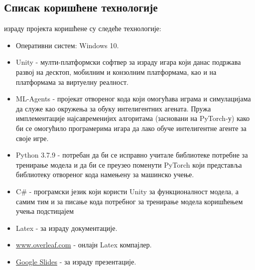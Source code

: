 \documentclass[12pt]{article}
\begin{document}
\subsection{Списак коришћене технологије}
 израду пројекта коришћене су следеће технологије:
\begin{itemize}
  \item Оперативни систем: Windows 10.
  \item Unity - мулти-платформски софтвер за израду игара који данас подржава развој на десктоп, мобилним и конзолним платформама, као и на платформама за виртуелну реалност.
  \item ML-Agents - пројекат отвореног кода који омогућава играма и симулацијама да служе као окружења за обуку интелигентних агената. Пружа имплементације најсавременијих алгоритама (засновани на PyTorch-у) како би се омогућило програмерима игара да лако обуче интелигентне агенте за своје игре.
  \item Python 3.7.9 - потребан да би се исправно учитале библиотеке потребне за тренирање модела и да би се преузео поменути PyTorch који представља библиотеку отвореног кода намењену за машинско учење. 
  \item C\# - програмски језик који користи Unity за функционалност модела, а самим тим и за писање кода потребног за тренирање модела коришћењем учења подстицајем
  \item Latex - за израду документације.
  \item \url{www.overleaf.com} - онлајн Latex компајлер.
  \item \href{https://www.google.com/slides/about/}{Google Slides} - за израду презентације.
\end{itemize}
\end{document}

